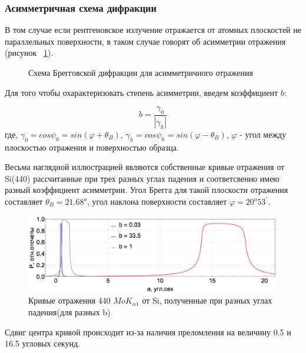 \subsubsection{Асимметричная схема дифракции}
В том случае если рентгеновское излучение отражается от атомных плоскостей не
 параллельных поверхности, в таком случае говорят об асимметрии отражения (рисунок ~\ref{ris:assymetric_brag}).

\begin{figure}[h]
  \centering
  \hfill
  \caption{Схема Брегговской дифракции для асимметричного отражения}
  \label{ris:assymetric_brag}
\end{figure}

Для того чтобы охарактеризовать степень асимметрии, введем коэффициент $b$:

\begin{equation}
  b = \frac {\gamma_0}{|\gamma_h|}
 \end{equation}
где, $\gamma_0 = cos \psi_0 = sin ( \varphi + \theta_B)$, $\gamma_h = cos \psi_h = sin ( \varphi - \theta_B)$,
$\varphi$ - угол между плоскостью отражения и поверхностью образца.


Весьма наглядной иллюстрацией являются собственные кривые отражения от Si(440) рассчитанные при
трех разных углах падения и соответсвенно имею разный коэффициент асимметрии. Угол
Брегга для такой плоскости отражения составляет $\theta_B = 21.68^o$, угол наклона поверхности
составляет $\varphi = 20^o 53^{'}$.

\begin{figure}[H]
\centering
\includegraphics[width=0.99\textwidth]{images/rocking_curve_assym_3.png}
\caption{Кривые отражения 440 $MoK_{\alpha 1}$ от Si, полученные при разных углах падения(для разных b)}
\label{ris:rocking_curve_assym_3}
\end{figure}
Сдвиг центра кривой происходит из-за наличия преломления на величину 0.5 и 16.5 угловых секунд.

